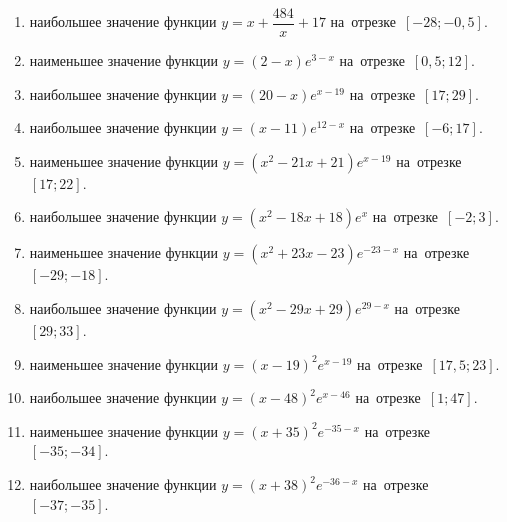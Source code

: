 \documentclass[a4paper,10pt]{article}
\begin{document}
\begin{enumerate}
\item {} наибольшее значение функции $y=x+\dfrac{484}{x} +17$ на~отрезке~$\left[-28;-0,5\right]$.

\item {} наименьшее значение функции $y=\left(2-x\right)e^{3-x}$ на~отрезке~$\left[0,5;12\right]$.







\item {} наибольшее значение функции $y=\left(20-x\right)e^{x-19}$ на~отрезке~$\left[17;29\right]$.







\item {} наибольшее значение функции $y=\left(x-11\right)e^{12-x}$ на~отрезке~$\left[-6;17\right]$.







\item {} наименьшее значение функции $y=\left(x^2 -21x +21\right)e^{x -19}$ на~отрезке~$\left[17;22\right]$.

\item {} наибольшее значение функции $y=\left(x^2 -18x +18\right)e^{x}$ на~отрезке~$\left[-2;3\right]$.

\item {} наименьшее значение функции $y=\left(x^2 +23x -23\right)e^{-23-x}$ на~отрезке~$\left[-29;-18\right]$.

\item {} наибольшее значение функции $y=\left(x^2 -29x +29\right)e^{29-x}$ на~отрезке~$\left[29;33\right]$.

\item {} наименьшее значение функции $y=\left(x-19\right)^2e^{x-19}$ на~отрезке~$\left[17,5;23\right]$.

\item {} наибольшее значение функции $y=\left(x-48\right)^2e^{x-46}$ на~отрезке~$\left[1;47\right]$.

\item {} наименьшее значение функции $y=\left(x+35\right)^2e^{-35-x}$ на~отрезке~$\left[-35;-34\right]$.

\item {} наибольшее значение функции $y=\left(x+38\right)^2e^{-36-x}$ на~отрезке~$\left[-37;-35\right]$.


\end{enumerate}
\end{document}
